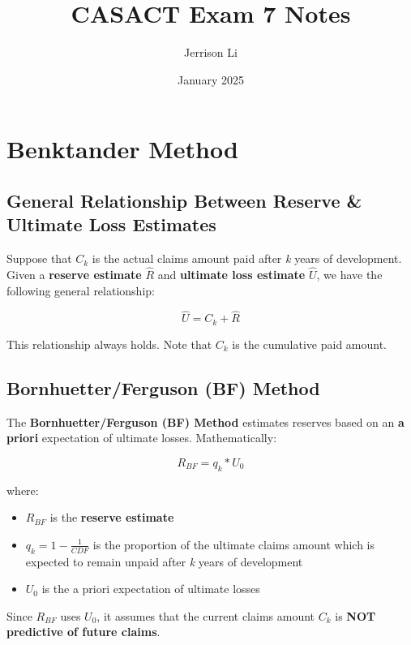 \documentclass{article}
\title{CASACT Exam 7 Notes}
\author{Jerrison Li }
\date{January 2025}
\begin{document}
\maketitle

\section{Benktander Method}

\subsection{General Relationship Between Reserve \& Ultimate Loss Estimates }

Suppose that $C_k$ is the actual claims amount paid after \textit{k} years of
development. Given a \textbf{reserve estimate} $\widehat{R}$ and 
\textbf{ultimate loss estimate} $\widehat{U}$, we have the following general
relationship:

\begin{equation}
\widehat{U} = C_k + \widehat{R}
\end{equation}

This relationship always holds. Note that $C_k$ is the cumulative paid amount.



\subsection{Bornhuetter/Ferguson (BF) Method }

The \textbf{Bornhuetter/Ferguson (BF) Method} estimates reserves based on an
\textbf{a priori} expectation of ultimate losses. Mathematically:

\begin{equation}
R_{BF} = q_k * U_0
\end{equation}

where:

\begin{itemize}
    \item $R_{BF}$ is the \textbf{reserve estimate}
    \item $q_k = 1 - \frac{1}{CDF}$ is the proportion of the ultimate claims
amount which is expected to remain unpaid after \textit{k} years of development
    \item $U_0$ is the a priori expectation of ultimate losses
\end{itemize}

Since $R_{BF}$ uses $U_0$, it assumes that the current claims amount $C_k$ is
\textbf{NOT predictive of future claims}.
\end{document}
